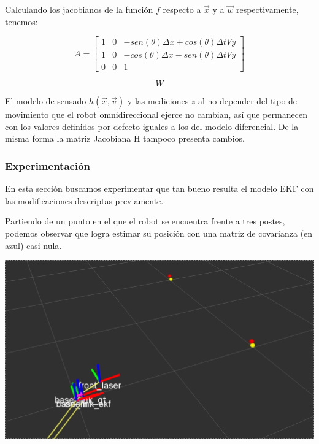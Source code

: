 Calculando los jacobianos de la función $f$ respecto a $\overrightarrow{x}$ y a $\overrightarrow{w}$ respectivamente, tenemos:

$$A= \begin{bmatrix}
         1 & 0 & -sen(\theta)\Delta x + cos(\theta) \Delta t V y\\
         1 & 0 & -cos(\theta)\Delta x - sen(\theta) \Delta t V y \\
         0 & 0 & 1
         \end{bmatrix}$$

$$W$$

El modelo de sensado $h(\overrightarrow{x},\overrightarrow{v})$ y las mediciones $z$ al no depender del tipo de movimiento que el robot omnidireccional ejerce no cambian, así que permanecen con los valores definidos por defecto iguales a los del modelo diferencial. De la misma forma la matriz Jacobiana H tampoco presenta cambios.


\subsubsection{Experimentación}

En esta sección buscamos experimentar que tan bueno resulta el modelo EKF con las modificaciones descriptas previamente.

Partiendo de un punto en el que el robot se encuentra frente a tres postes, podemos observar que logra estimar su posición con una matriz de covarianza (en azul) casi nula.

\includegraphics[scale=0.3]{punto4/ekfViendoTodosLosPostes.png}


